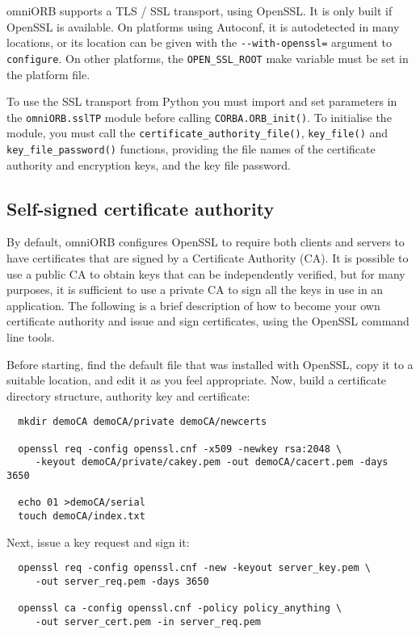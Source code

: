 \documentclass[11pt,oneside,a4paper]{book}
\newcommand{\code}[1]{\texttt{#1}}
\newcommand{\op}[1]{\texttt{#1()}}
\begin{document}
omniORB supports a TLS / SSL transport, using OpenSSL. It is only
built if OpenSSL is available. On platforms using Autoconf, it is
autodetected in many locations, or its location can be given with the
\code{-{}-with-openssl=} argument to \code{configure}. On other
platforms, the \code{OPEN\_SSL\_ROOT} make variable must be set in the
platform file.

To use the SSL transport from Python you must import and set
parameters in the \code{omniORB.sslTP} module before calling
\op{CORBA.ORB\_init}. To initialise the module, you must call the
\op{certificate\_authority\_file}, \op{key\_file} and
\op{key\_file\_password} functions, providing the file names of the
certificate authority and encryption keys, and the key file password.

\subsection{Self-signed certificate authority}

By default, omniORB configures OpenSSL to require both clients and
servers to have certificates that are signed by a Certificate
Authority (CA). It is possible to use a public CA to obtain keys that
can be independently verified, but for many purposes, it is sufficient
to use a private CA to sign all the keys in use in an application. The
following is a brief description of how to become your own certificate
authority and issue and sign certificates, using the OpenSSL command
line tools.

Before starting, find the default  file that was
installed with OpenSSL, copy it to a suitable location, and edit it as
you feel appropriate. Now, build a certificate directory structure,
authority key and certificate:

\begin{verbatim}
  mkdir demoCA demoCA/private demoCA/newcerts

  openssl req -config openssl.cnf -x509 -newkey rsa:2048 \
     -keyout demoCA/private/cakey.pem -out demoCA/cacert.pem -days 3650

  echo 01 >demoCA/serial
  touch demoCA/index.txt
\end{verbatim}

\noindent Next, issue a key request and sign it:

\begin{verbatim}
  openssl req -config openssl.cnf -new -keyout server_key.pem \
     -out server_req.pem -days 3650

  openssl ca -config openssl.cnf -policy policy_anything \
     -out server_cert.pem -in server_req.pem 
\end{verbatim}
\end{document}

